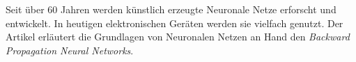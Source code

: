 Seit über 60 Jahren werden künstlich erzeugte Neuronale Netze erforscht und entwickelt. In heutigen elektronischen Geräten werden sie vielfach genutzt. Der Artikel erläutert die Grundlagen von Neuronalen Netzen an Hand den \emph{Backward Propagation Neural Networks}.